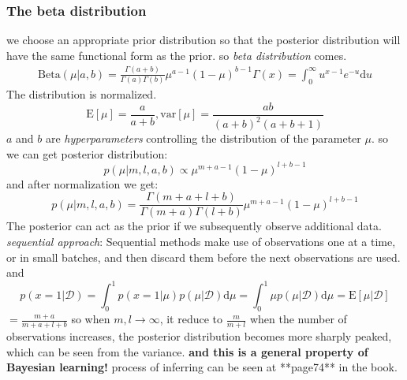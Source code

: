 \documentclass[a4paper]{book}
\begin{document}
\subsubsection{The beta distribution}
we choose an appropriate prior  distribution so that the posterior distribution will have the same functional form as the prior. so \emph{beta distribution} comes.
\begin{gather}\label{1.2.3}
  \mathrm  {Beta}(\mu|a,b) = \frac{\Gamma(a+b)}{\Gamma(a)\Gamma(b)}\mu^{a-1}(1-\mu)^{b-1}
\Gamma(x)=\int_0^\infty u^{x-1}e^{-u}\mathrm du
\end{gather}
The distribution is normalized.
$$\mathrm E[\mu] = \frac a{a+b}, \mathrm {var}[\mu] = \frac{ab}{(a+b)^2(a+b+1)}$$
$a$ and $b$ are \emph{hyperparameters} controlling the distribution of the parameter $\mu$.\newline
so we can get posterior distribution:
$$p(\mu|m,l,a,b) \propto \mu^{m+a-1}(1-\mu)^{l+b-1}$$
and after normalization we get:
$$p(\mu|m,l,a,b) = \frac{\Gamma(m+a+l+b)}{\Gamma(m+a)\Gamma(l+b)} \mu^{m+a-1}(1-\mu)^{l+b-1}$$
The posterior can act as the prior if we subsequently observe additional data.
\emph{sequential approach}:
Sequential methods make use of observations one at a time, or in small batches, and then discard them before the next observations are used.\newline
and
\begin{equation}\label{1.2.4}
  p(x=1|\mathcal D) = \int_0^1p(x=1|\mu)p(\mu|\mathcal D)\mathrm d\mu = \int_0^1\mu p(\mu|\mathcal D)\mathrm d\mu=\mathrm E[\mu|\mathcal D]
\end{equation}
$=\frac{m+a}{m+a+l+b}$\newline
so when $m,l\rightarrow \infty$, it reduce to $\frac{m}{m+l}$\newline
when the number of observations increases, the posterior distribution becomes more sharply peaked, which can be seen from the variance.
\textbf{and this is a general property of Bayesian learning!}\newline
process of inferring can be seen at **page74** in the book.
\end{document}
